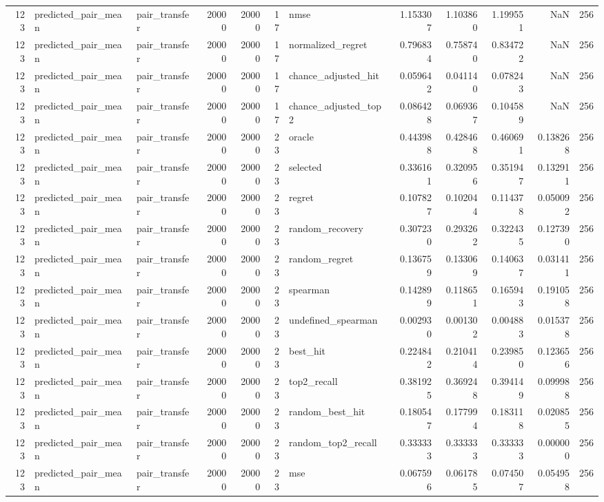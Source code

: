 \begin{tabular}{rllrrrlrrrrr}
123 & predicted_pair_mean & pair_transfer & 20000 & 20000 & 17 & nmse & 1.153307 & 1.103860 & 1.199551 & NaN & 256 \\
123 & predicted_pair_mean & pair_transfer & 20000 & 20000 & 17 & normalized_regret & 0.796834 & 0.758740 & 0.834722 & NaN & 256 \\
123 & predicted_pair_mean & pair_transfer & 20000 & 20000 & 17 & chance_adjusted_hit & 0.059642 & 0.041140 & 0.078243 & NaN & 256 \\
123 & predicted_pair_mean & pair_transfer & 20000 & 20000 & 17 & chance_adjusted_top2 & 0.086428 & 0.069367 & 0.104589 & NaN & 256 \\
123 & predicted_pair_mean & pair_transfer & 20000 & 20000 & 23 & oracle & 0.443988 & 0.428468 & 0.460691 & 0.138268 & 256 \\
123 & predicted_pair_mean & pair_transfer & 20000 & 20000 & 23 & selected & 0.336161 & 0.320956 & 0.351947 & 0.132911 & 256 \\
123 & predicted_pair_mean & pair_transfer & 20000 & 20000 & 23 & regret & 0.107827 & 0.102044 & 0.114378 & 0.050092 & 256 \\
123 & predicted_pair_mean & pair_transfer & 20000 & 20000 & 23 & random_recovery & 0.307230 & 0.293262 & 0.322435 & 0.127390 & 256 \\
123 & predicted_pair_mean & pair_transfer & 20000 & 20000 & 23 & random_regret & 0.136759 & 0.133069 & 0.140637 & 0.031411 & 256 \\
123 & predicted_pair_mean & pair_transfer & 20000 & 20000 & 23 & spearman & 0.142899 & 0.118651 & 0.165943 & 0.191058 & 256 \\
123 & predicted_pair_mean & pair_transfer & 20000 & 20000 & 23 & undefined_spearman & 0.002930 & 0.001302 & 0.004883 & 0.015378 & 256 \\
123 & predicted_pair_mean & pair_transfer & 20000 & 20000 & 23 & best_hit & 0.224842 & 0.210414 & 0.239850 & 0.123656 & 256 \\
123 & predicted_pair_mean & pair_transfer & 20000 & 20000 & 23 & top2_recall & 0.381925 & 0.369248 & 0.394149 & 0.099988 & 256 \\
123 & predicted_pair_mean & pair_transfer & 20000 & 20000 & 23 & random_best_hit & 0.180547 & 0.177994 & 0.183118 & 0.020855 & 256 \\
123 & predicted_pair_mean & pair_transfer & 20000 & 20000 & 23 & random_top2_recall & 0.333333 & 0.333333 & 0.333333 & 0.000000 & 256 \\
123 & predicted_pair_mean & pair_transfer & 20000 & 20000 & 23 & mse & 0.067596 & 0.061785 & 0.074507 & 0.054958 & 256 \\

\end{tabular}
